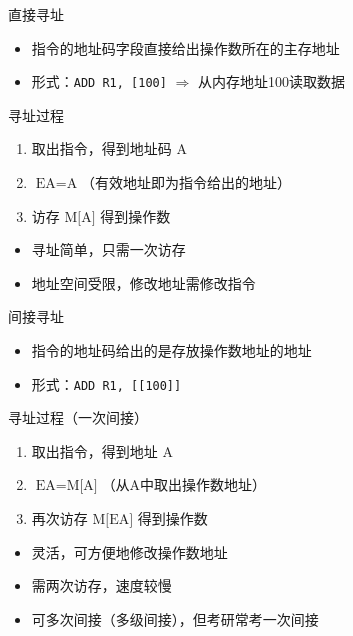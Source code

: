 \documentclass[10pt, aspectratio=169]{beamer}
\begin{document}
\begin{frame}{直接寻址}
    \begin{itemize}
        \item 指令的地址码字段直接给出操作数所在的主存地址
        \item 形式：\texttt{ADD R1, [100]} $\Rightarrow$ 从内存地址100读取数据
    \end{itemize}
    \vspace{0.3em}
    \begin{block}{寻址过程}
        \begin{enumerate}
            \item 取出指令，得到地址码 A
            \item $\text{EA} = \text{A}$（有效地址即为指令给出的地址）
            \item 访存 $\text{M[A]}$ 得到操作数
        \end{enumerate}
    \end{block}
    \vspace{0.3em}
    \begin{itemize}
        \item[+] 寻址简单，只需一次访存
        \item[-] 地址空间受限，修改地址需修改指令
    \end{itemize}
\end{frame}

\begin{frame}{间接寻址}
    \begin{itemize}
        \item 指令的地址码给出的是存放操作数地址的地址
        \item 形式：\texttt{ADD R1, [[100]]}
    \end{itemize}
    \vspace{0.3em}
    \begin{block}{寻址过程（一次间接）}
        \begin{enumerate}
            \item 取出指令，得到地址 A
            \item $\text{EA} = \text{M[A]}$（从A中取出操作数地址）
            \item 再次访存 $\text{M[EA]}$ 得到操作数
        \end{enumerate}
    \end{block}
    \vspace{0.3em}
    \begin{itemize}
        \item[+] 灵活，可方便地修改操作数地址
        \item[-] 需两次访存，速度较慢
        \item[!] 可多次间接（多级间接），但考研常考一次间接
    \end{itemize}
\end{frame}
\end{document}
